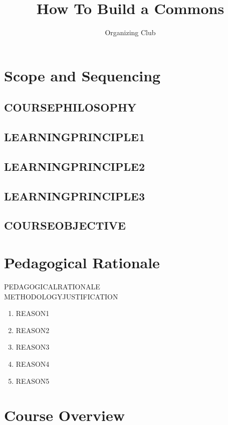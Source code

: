 \documentclass{article}
\title{How To Build a Commons}
\author{Organizing Club}
\begin{document}
\maketitle

\section{Scope and Sequencing}

\subsection{COURSEPHILOSOPHY}
\subsection{LEARNINGPRINCIPLE1}
\subsection{LEARNINGPRINCIPLE2}
\subsection{LEARNINGPRINCIPLE3}
\subsection{COURSEOBJECTIVE}

\pagebreak
\section{Pedagogical Rationale}

PEDAGOGICALRATIONALE \\
METHODOLOGYJUSTIFICATION

\begin{enumerate}
\item REASON1

\item REASON2

\item REASON3

\item REASON4

\item REASON5
 
\end{enumerate}

\pagebreak

\section{Course Overview}
\end{document}
